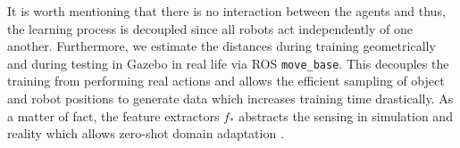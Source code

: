 \begin{confidential}
It is worth mentioning that there is no interaction between the agents and thus, the learning process is decoupled since all robots act independently of one another.
%
Furthermore, we estimate the distances during training geometrically and during testing in Gazebo in real life via ROS \texttt{move\_base}.
%
This decouples the training from performing real actions and allows the efficient sampling of object and robot positions to generate data which increases training time drastically.
%
As a matter of fact, the feature extractors $f_{*}$ abstracts the sensing in simulation and reality which allows zero-shot domain adaptation \cite{Higgins2017}.
%
%
%
%
%
%
%
%
%


\end{confidential}
